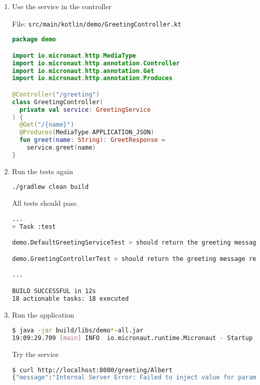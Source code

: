 \begin{enumerate}
The controller is not making use of the service yet and it is creating the instance of \texttt{GreetResponse}.

\item Use the service in the controller

File: \texttt{src/main/kotlin/demo/GreetingController.kt}
\begin{lstlisting}[language=Kotlin]
package demo

import io.micronaut.http.MediaType
import io.micronaut.http.annotation.Controller
import io.micronaut.http.annotation.Get
import io.micronaut.http.annotation.Produces

@Controller("/greeting")
class GreetingController(
  private val service: GreetingService
) {
  @Get("/{name}")
  @Produces(MediaType.APPLICATION_JSON)
  fun greet(name: String): GreetResponse =
    service.greet(name)
}
\end{lstlisting}

\item Run the tests again

\begin{lstlisting}[language=bash]
./gradlew clean build
\end{lstlisting}

All tests should pass.

\begin{lstlisting}[language=bash]
...
> Task :test

demo.DefaultGreetingServiceTest > should return the greeting message for the given name PASSED

demo.GreetingControllerTest > should return the greeting message returned by the greeting service PASSED

...

BUILD SUCCESSFUL in 12s
18 actionable tasks: 18 executed
\end{lstlisting}

\item Run the application

\begin{lstlisting}[language=bash]
$ java -jar build/libs/demo*-all.jar
19:09:29.709 [main] INFO  io.micronaut.runtime.Micronaut - Startup completed in 924ms. Server Running: http://localhost:8080
\end{lstlisting}

Try the service

\begin{lstlisting}[language=bash]
$ curl http://localhost:8080/greeting/Albert
{"message":"Internal Server Error: Failed to inject value for parameter [service] of class: demo.GreetingController\n\nMessage: No bean of type [demo.GreetingService] exists. Make sure the bean is not disabled by bean requirements (enable trace logging for 'io.micronaut.context.condition' to check) and if the bean is enabled then ensure the class is declared a bean and annotation processing is enabled (for Java and Kotlin the 'micronaut-inject-java' dependency should be configured as an annotation processor).\nPath Taken: new GreetingController([GreetingService service])"}
\end{lstlisting}


\end{enumerate}

